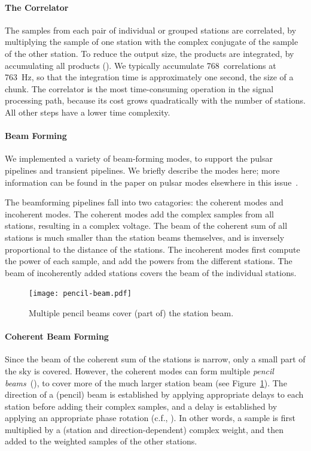 \paragraph{The Correlator }
The samples from each pair of individual or grouped stations are
correlated, by multiplying the sample of one station with the complex conjugate
of the sample of the other station.
To reduce the output size, the products are integrated, by accumulating all
products ().
We typically accumulate 768~correlations at 763~Hz, so that the integration
time is approximately one second, the size of a chunk.
The correlator is the most time-consuming operation in the signal
processing path, because its cost grows quadratically with the number of
stations.
All other steps have a lower time complexity.


\paragraph{Beam Forming}
\label{sec:beam-forming}
We implemented a variety of beam-forming modes, to support the pulsar pipelines
and transient pipelines.
We briefly describe the modes here; more information can be found in the
paper on pulsar modes elsewhere in this issue~\cite{Hessels:10}.

The beamforming pipelines fall into two catagories: the coherent modes and
incoherent modes.
The coherent modes add the complex samples from all stations, resulting in a
complex voltage.
The beam of the coherent sum of all stations is much smaller than the station
beams themselves, and is inversely proportional to the distance of the stations.
The incoherent modes first compute the power of each sample, and add the
powers from the different stations.
The beam of incoherently added stations covers the beam of the individual
stations.


\begin{figure}
\vspace{-9mm}
\begin{center}
\texttt{[image: pencil-beam.pdf]}
\end{center}
\caption{Multiple pencil beams cover (part of) the station beam.}
\vspace{-5mm}
\label{fig:pencil-beams}
\end{figure}
\paragraph{Coherent Beam Forming}
Since the beam of the coherent sum of the stations is narrow, only a small
part of the sky is covered.
However, the coherent modes can form multiple
\emph{pencil beams\/}~(), to cover more of the much larger
station beam (see Figure~\ref{fig:pencil-beams}).
The direction of a (pencil) beam is established by applying appropriate
delays to each station before adding their complex samples, and a delay is
established by applying an appropriate phase rotation (c.f., ).
In other words, a sample is first multiplied by a (station and
direction-dependent) complex weight, and then added to the weighted samples
of the other stations.

